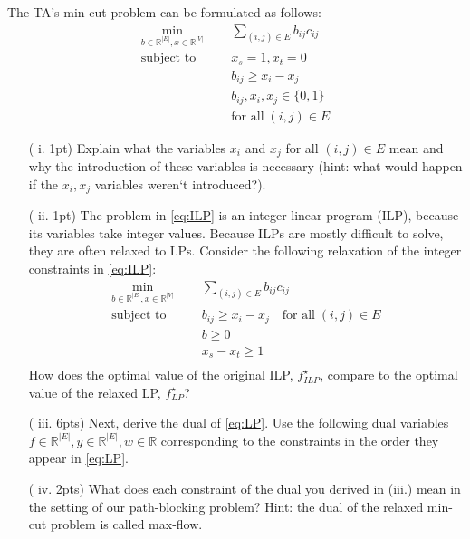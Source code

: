 \documentclass{article}
\theoremstyle{remark}
\theoremstyle{definition}
\newcommand{\subjectto}{\mbox{subject to}}
\begin{document}
\begin{enumerate}[(a, 3pts)]
	\quad \quad The TA's min cut problem can be formulated as follows:
	    \begin{equation} \label{eq:ILP}
        \begin{aligned}
		\min_{b\in \mathbb{R}^{|E|}, x\in \mathbb{R}^{|V|}} \quad & \sum_{(i,j)\in E}b_{ij}c_{ij} \\
		\subjectto \quad  \quad   & x_s = 1, x_t = 0 \\
				     &  b_{ij}  \geq x_i - x_j \\
    				     & b_{ij}, x_i, x_j \in \{0,1\} \\
    				     & \text{for all} \; (i,j) \in E
		\end{aligned}
		\end{equation}
    \begin{enumerate}
    \item[( i. 1pt)] Explain what the variables $x_i$ and $x_j$ for all $(i,j) \in E$ mean and why the introduction of these variables is necessary (hint: what would happen if the $x_i,x_j$ variables weren`t introduced?).
	\item[( ii. 1pt)]  The problem in \eqref{eq:ILP} is an integer linear program (ILP), because its variables take integer values. Because ILPs are mostly difficult to solve, they are often relaxed to LPs. Consider the following relaxation of the integer constraints in \eqref{eq:ILP}:
	    \begin{equation}
        \begin{aligned}
		\min_{b\in \mathbb{R}^{|E|}, x\in \mathbb{R}^{|V|}} \quad & \sum_{(i,j)\in E}b_{ij}c_{ij} \\
		\subjectto \quad    \quad  &  b_{ij}  \geq x_i - x_j \quad \text{for all} \; (i,j) \in E \\
    				                & b \geq 0 \\
    				                & x_s - x_t \geq 1 \\
		\end{aligned}
		\label{eq:LP}
		\end{equation}
	How does the optimal value of the original ILP, $f^{\star}_{ILP}$, compare to the optimal value of the relaxed LP, $f^{\star}_{LP}$?
	\item[( iii. 6pts)]  Next, derive the dual of \eqref{eq:LP}. Use the following dual variables $f \in \mathbb{R}^{|E|}, y \in \mathbb{R}^{|E|}, w \in \mathbb{R}$ corresponding to the constraints in the order they appear in \eqref{eq:LP}.
	\item[( iv. 2pts)]  What does each constraint of the dual you derived in (iii.) mean in the setting of our path-blocking problem? Hint: the dual of the relaxed min-cut problem is called max-flow.

\end{enumerate}
\end{enumerate}
\end{document}
